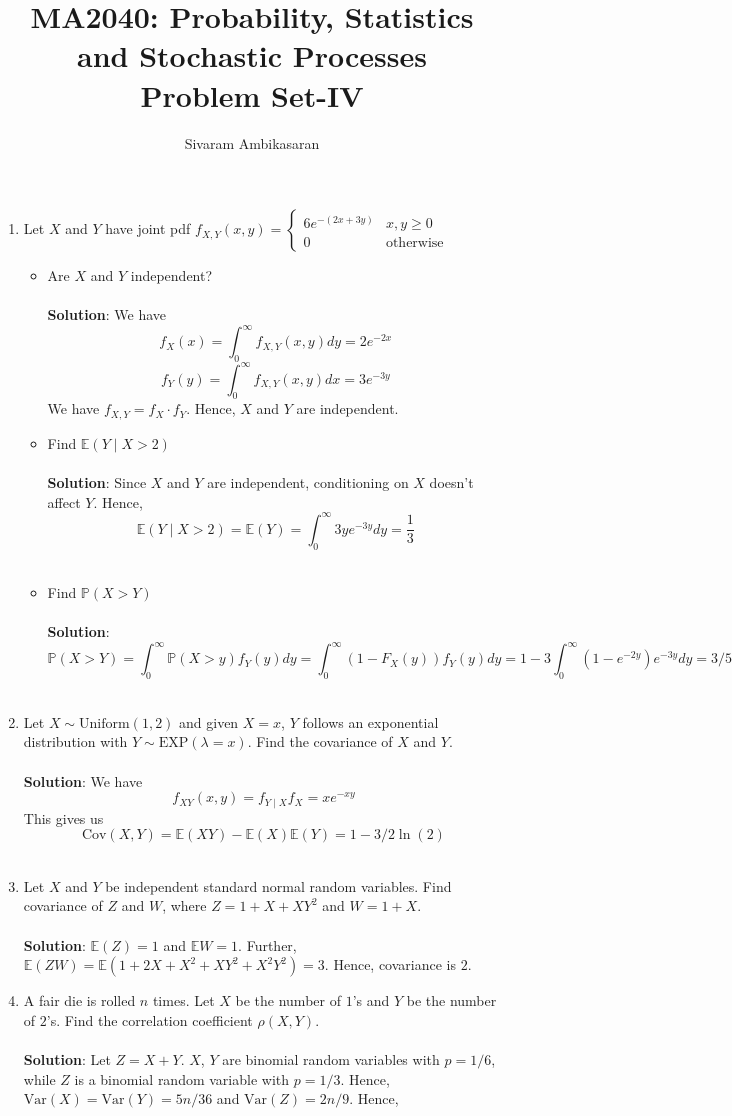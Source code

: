 \documentclass{article}
\title{MA2040: Probability, Statistics and Stochastic Processes\\
Problem Set-IV}
\author{Sivaram Ambikasaran}
\newcommand{\dint}{\displaystyle\int}
\newcommand{\Pb}{\mathbb{P}}
\newcommand{\Eb}{\mathbb{E}}
\newcommand{\bkt}[1]{\left(#1\right)}
\newcommand{\soln}[1]{\\ \textbf{Solution}:#1\\}
\begin{document}
	\maketitle
	\begin{enumerate}
		\item
		Let $X$ and $Y$ have joint pdf $f_{X,Y}(x,y) = \begin{cases}
		6 e^{-\bkt{2x+3y}} & x,y \geq 0\\
		0 & \text{otherwise}
		\end{cases}$
	\begin{itemize}
		\item
		Are $X$ and $Y$ independent?\\
		\soln{
		We have
		$$f_X(x) = \dint_0^{\infty}f_{X,Y}(x,y)dy = 2e^{-2x}$$
		$$f_Y(y) = \dint_0^{\infty}f_{X,Y}(x,y)dx = 3e^{-3y}$$
		We have $f_{X,Y} = f_X \cdot f_Y$. Hence, $X$ and $Y$ are independent.
		}
		\item
		Find $\mathbb{E}\bkt{Y \mid X>2}$\\
		\soln{
		Since $X$ and $Y$ are independent, conditioning on $X$ doesn't affect $Y$. Hence, $$\mathbb{E}\bkt{Y \mid X>2} = \mathbb{E}\bkt{Y} = \dint_0^{\infty}3ye^{-3y}dy = \dfrac13$$
		}
		\item
		Find $\Pb\bkt{X > Y}$\\
		\soln{
		$$\Pb\bkt{X > Y} = \dint_0^{\infty} \Pb\bkt{X>y}f_Y(y)dy = \dint_0^{\infty}\bkt{1-F_X\bkt{y}}f_Y(y)dy = 1-3\dint_0^{\infty}\bkt{1-e^{-2y}}e^{-3y}dy = 3/5$$
		}
	\end{itemize}
	\item
	Let $X \sim \text{Uniform}(1,2)$ and given $X=x$, $Y$ follows an exponential distribution with $Y \sim \text{EXP}\bkt{\lambda=x}$. Find the covariance of $X$ and $Y$.\\
	\soln{
	We have
	$$f_{XY}\bkt{x,y} = f_{Y \mid X}f_X = xe^{-xy}$$
	This gives us
	$$\text{Cov}\bkt{X,Y} = \Eb\bkt{XY}-\Eb\bkt{X}\Eb\bkt{Y} = 1-3/2 \ln(2)$$
	}
	\item
	Let $X$ and $Y$ be independent standard normal random variables. Find covariance of $Z$ and $W$, where $Z = 1+X+XY^2$ and $W = 1+X$.\\
	\soln{
	$\Eb\bkt{Z} = 1$ and $\Eb{W} = 1$. Further, $\Eb\bkt{ZW} = \Eb\bkt{1+2X+X^2 + XY^2 + X^2Y^2} = 3$.
	Hence, covariance is $2$.
	}
	\item
	A fair die is rolled $n$ times. Let $X$ be the number of $1$'s and $Y$ be the number of $2$'s. Find the correlation coefficient $\rho(X,Y)$.\\
	\soln{
	Let $Z=X+Y$. $X$, $Y$ are binomial random variables with $p=1/6$, while $Z$ is a binomial random variable with $p=1/3$. Hence, $\text{Var}(X) = \text{Var}(Y) = 5n/36$ and $\text{Var}(Z) = 2n/9$. Hence,
}
\end{enumerate}
\end{document}
